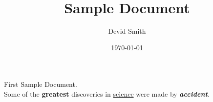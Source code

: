 \documentclass[14pt]{article}
\title{Sample Document}
\author{Devid Smith}
\date{\today}
\begin{document}
\maketitle
First Sample Document. \\
Some of the \textbf{greatest}
discoveries in \underline{science} 
were made by \textbf{\textit{accident}}.
\end{document}
